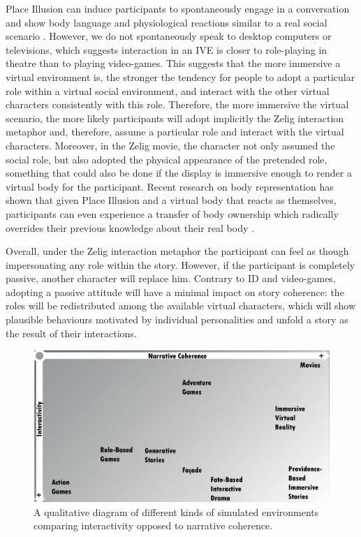 \documentclass[
		twoside,openright,titlepage,numbers=noenddot,manychapters,
		headinclude,%
                footinclude=false,cleardoublepage=empty,
                BCOR=5mm,
		fontsize=11pt, %
                 enabledeprecatedfontcommands]{scrreprt}
\begin{document}
Place Illusion can induce participants to spontaneously engage in a conversation and show body language and physiological reactions similar to a real social scenario \cite[]{rovira2009use, pan2012}. However, we do not spontaneously speak to desktop computers or televisions, which suggests interaction in an IVE is closer to role-playing in theatre than to playing video-games. This suggests that the more immersive a virtual environment is, the stronger the tendency for people to adopt a particular role within a virtual social environment, and interact with the other virtual characters consistently with this role. Therefore, the more immersive the virtual scenario, the more likely participants will adopt implicitly the Zelig interaction metaphor and, therefore, assume a particular role and interact with the virtual characters. Moreover, in the Zelig movie, the character not only assumed the social role, but also adopted the physical appearance of the pretended role, something that could also be done if the display is immersive enough to render a virtual body for the participant. Recent research on body representation has shown that given Place Illusion and a virtual body that reacts as themselves, participants can even experience a transfer of body ownership which radically overrides their previous knowledge about their real body \cite[]{Slater2010}. 

Overall, under the Zelig interaction metaphor the participant can feel as though impersonating any role within the story. However, if the participant is completely passive, another character will replace him. Contrary to ID and video-games, adopting a passive attitude will have a minimal impact on story coherence: the roles will be redistributed among the available virtual characters, which will show plausible behaviours motivated by individual personalities and unfold a story as the result of their interactions. 






\begin{figure}[tb]
\begin{center}
\includegraphics[width=12cm]{figures/diagram_leonardo.jpg}
\caption{A qualitative diagram of different kinds of simulated environments comparing interactivity opposed to narrative coherence.}
\label{diagram_leonardo}
\end{center}
\end{figure}
\end{document}
